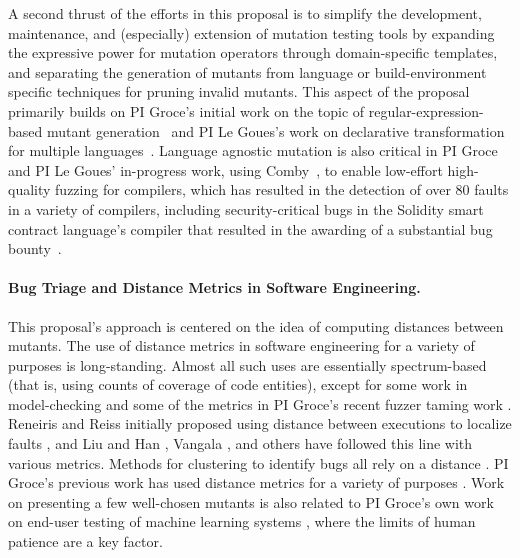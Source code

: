 A second thrust of the efforts in this proposal is to simplify the
development, maintenance, and (especially) extension of mutation
testing tools by
expanding the expressive power for
mutation operators through domain-specific templates, and separating the generation of mutants from
language or build-environment specific techniques for pruning invalid
mutants.  This aspect of the proposal primarily builds on PI Groce's initial work on the topic of
regular-expression-based mutant generation~\cite{regexpMut} and
PI Le Goues's work on declarative transformation for multiple
languages~\cite{rvt-ppc}.  Language agnostic mutation is also critical
in PI Groce and PI Le Goues' in-progress work, using
Comby~\cite{rvt-ppc}, to enable low-effort high-quality fuzzing for
compilers, which has resulted in the detection of over 80 faults in a
variety of compilers, including security-critical bugs in the Solidity
smart contract language's compiler that resulted in the awarding of a
substantial bug bounty~\cite{aflcompfuzz,tobsolcfuzz1,tobsolcfuzz2}.

\paragraph{Bug Triage and Distance Metrics in Software Engineering.}
%
This proposal's approach is centered on
the idea of computing distances between mutants.  The use of distance metrics in
software engineering for a variety of  
purposes is long-standing.  Almost all such uses are
essentially spectrum-based \cite{RepsSpectra} (that is, using counts
of coverage of code entities), except for some work in model-checking
\cite{GroceDist,ChakiLev} and some of the metrics in PI Groce's recent fuzzer
taming work \cite{PLDI13}.  Reneiris and Reiss initially proposed
using distance between executions to localize faults
\cite{NearNeighbor}, and Liu and Han \cite{Liu06}, Vangala \cite{VangalaDist}, and others have
followed this line with various metrics.
Methods for clustering to identify bugs all rely on a distance \cite{Podgurski04}.  PI Groce's previous work
has used distance metrics for a variety of purposes 
\cite{PLDI13,icst2014,issta14,distMut}.
Work on
presenting a few well-chosen mutants
is also related to PI Groce's own work on end-user testing of machine learning
systems \cite{EndUserMistake,OnlyOracle}, where the limits of human
patience are a key factor.  
